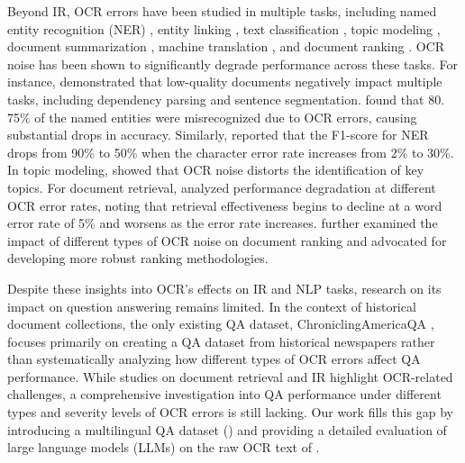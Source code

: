 Beyond IR, OCR errors have been studied in multiple tasks, including named entity recognition (NER) \cite{hamdi2020assessing, hamdi2023depth}, entity linking \cite{linhares2019impact}, text classification \cite{zu2004impact, vitman2022evaluating}, topic modeling \cite{mutuvi2018evaluating, zosa2021evaluating}, document summarization \cite{jing2003summarizing}, machine translation \cite{farooq12005effect, khayrallah-koehn-2018-impact}, and document ranking \cite{giamphy2023quantitative}. OCR noise has been shown to significantly degrade performance across these tasks. For instance, \citet{vanStrien2020AssessingTI} demonstrated that low-quality documents negatively impact multiple tasks, including dependency parsing and sentence segmentation.
\citet{hamadi20220cr} found that 80. 75\% of the named entities were misrecognized due to OCR errors, causing substantial drops in accuracy. Similarly, \citet{hamdi2023depth} reported that the F1-score for NER drops from 90\% to 50\% when the character error rate increases from 2\% to 30\%. 
In topic modeling, \citet{mutuvi2018evaluating} showed that OCR noise distorts the identification of key topics. For document retrieval, \citet{OCR-IR} analyzed performance degradation at different OCR error rates, noting that retrieval effectiveness begins to decline at a word error rate of 5\% and worsens as the error rate increases. \citet{giamphy2023quantitative} further examined the impact of different types of OCR noise on document ranking and advocated for developing more robust ranking methodologies.

Despite these insights into OCR's effects on IR and NLP tasks, research on its impact on question answering remains limited. In the context of historical document collections, the only existing QA dataset, ChroniclingAmericaQA \cite{chroniclingamericaqa}, focuses primarily on creating a QA dataset from historical newspapers rather than systematically analyzing how different types of OCR errors affect QA performance. While studies on document retrieval and IR highlight OCR-related challenges, a comprehensive investigation into QA performance under different types and severity levels of OCR errors is still lacking. Our work fills this gap by introducing a multilingual QA dataset (\MultiOCR) and providing a detailed evaluation of large language models (LLMs) on the raw OCR text of \MultiOCR.

